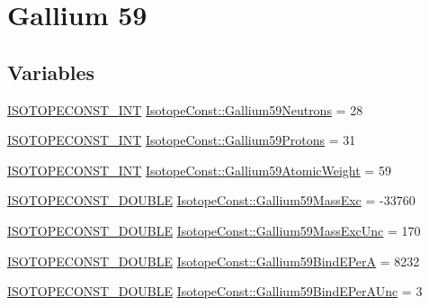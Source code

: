 \hypertarget{group___isotope_const-_gallium-_ga59}{}\section{Gallium 59}
\label{group___isotope_const-_gallium-_ga59}
\subsection*{Variables}
\begin{DoxyCompactItemize}
\item 
\mbox{\hyperlink{group___isotope_const-_macros_ga5f18360b3e99483a35c32d789e62621c}{I\+S\+O\+T\+O\+P\+E\+C\+O\+N\+S\+T\+\_\+\+I\+NT}} \mbox{\hyperlink{group___isotope_const-_gallium-_ga59_ga9fa4aea9d7c8603ef453491385b2478b}{Isotope\+Const\+::\+Gallium59\+Neutrons}} = 28
\item 
\mbox{\hyperlink{group___isotope_const-_macros_ga5f18360b3e99483a35c32d789e62621c}{I\+S\+O\+T\+O\+P\+E\+C\+O\+N\+S\+T\+\_\+\+I\+NT}} \mbox{\hyperlink{group___isotope_const-_gallium-_ga59_ga3851c542e65a4df9c8d15432a16f2ee9}{Isotope\+Const\+::\+Gallium59\+Protons}} = 31
\item 
\mbox{\hyperlink{group___isotope_const-_macros_ga5f18360b3e99483a35c32d789e62621c}{I\+S\+O\+T\+O\+P\+E\+C\+O\+N\+S\+T\+\_\+\+I\+NT}} \mbox{\hyperlink{group___isotope_const-_gallium-_ga59_gaaa383da4526d318a999111986826e646}{Isotope\+Const\+::\+Gallium59\+Atomic\+Weight}} = 59
\item 
\mbox{\hyperlink{group___isotope_const-_macros_ga8f45a7272ce02c0b4c65c44636ed719a}{I\+S\+O\+T\+O\+P\+E\+C\+O\+N\+S\+T\+\_\+\+D\+O\+U\+B\+LE}} \mbox{\hyperlink{group___isotope_const-_gallium-_ga59_ga1356ecb63b396d3945ef4db6884b9479}{Isotope\+Const\+::\+Gallium59\+Mass\+Exc}} = -\/33760
\item 
\mbox{\hyperlink{group___isotope_const-_macros_ga8f45a7272ce02c0b4c65c44636ed719a}{I\+S\+O\+T\+O\+P\+E\+C\+O\+N\+S\+T\+\_\+\+D\+O\+U\+B\+LE}} \mbox{\hyperlink{group___isotope_const-_gallium-_ga59_ga3a3f208512d7182d0bef76e6c1239799}{Isotope\+Const\+::\+Gallium59\+Mass\+Exc\+Unc}} = 170
\item 
\mbox{\hyperlink{group___isotope_const-_macros_ga8f45a7272ce02c0b4c65c44636ed719a}{I\+S\+O\+T\+O\+P\+E\+C\+O\+N\+S\+T\+\_\+\+D\+O\+U\+B\+LE}} \mbox{\hyperlink{group___isotope_const-_gallium-_ga59_gaaca3afaac892f5ae67d9c1447d4f784a}{Isotope\+Const\+::\+Gallium59\+Bind\+E\+PerA}} = 8232
\item 
\mbox{\hyperlink{group___isotope_const-_macros_ga8f45a7272ce02c0b4c65c44636ed719a}{I\+S\+O\+T\+O\+P\+E\+C\+O\+N\+S\+T\+\_\+\+D\+O\+U\+B\+LE}} \mbox{\hyperlink{group___isotope_const-_gallium-_ga59_ga87a55178193490b806bb665f1185962b}{Isotope\+Const\+::\+Gallium59\+Bind\+E\+Per\+A\+Unc}} = 3

\end{DoxyCompactItemize}

